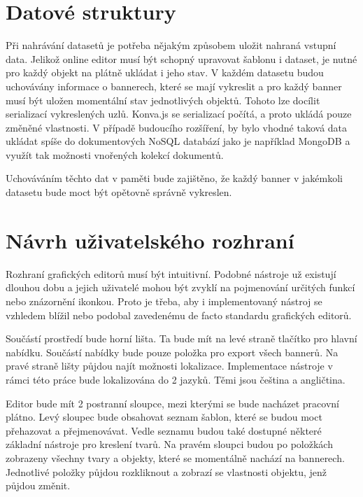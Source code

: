     \section{Datové struktury}
    Při nahrávání datasetů je potřeba nějakým způsobem uložit nahraná vstupní data. Jelikož online editor musí být schopný upravovat šablonu i dataset,
    je nutné pro každý objekt na plátně ukládat i jeho stav. V každém datasetu budou uchovávány informace o bannerech, které se mají vykreslit
    a pro každý banner musí být uložen momentální stav jednotlivých objektů. Tohoto lze docílit serializací vykreslených uzlů.
    Konva.js se serializací počítá, a proto ukládá pouze změněné vlastnosti. V případě budoucího rozšíření, by bylo vhodné taková data ukládat spíše do
    dokumentových NoSQL databází jako je například MongoDB a využít tak možnosti vnořených kolekcí dokumentů. 

    Uchováváním těchto dat v paměti bude zajištěno, že každý banner v jakémkoli datasetu bude moct být opětovně správně vykreslen.

    \section{Návrh uživatelského rozhraní}
    Rozhraní grafických editorů musí být intuitivní. Podobné nástroje už existují dlouhou dobu a jejich uživatelé mohou být zvyklí na pojmenování určitých funkcí
    nebo znázornění ikonkou. Proto je třeba, aby i implementovaný nástroj se vzhledem blížil nebo podobal zavedenému de facto standardu grafických editorů. 

    Součástí prostředí bude horní lišta. Ta bude mít na levé straně tlačítko pro hlavní nabídku. Součástí nabídky bude pouze položka pro export všech bannerů.
    Na pravé straně lišty půjdou najít možnosti lokalizace. Implementace nástroje v rámci této práce bude lokalizována do 2 jazyků. Těmi jsou čeština a angličtina. 

    Editor bude mít 2 postranní sloupce, mezi kterými se bude nacházet pracovní plátno. Levý sloupec bude obsahovat seznam šablon,
    které se budou moct přehazovat a přejmenovávat. Vedle seznamu budou také dostupné některé základní nástroje pro kreslení tvarů.
    Na pravém sloupci budou po položkách zobrazeny všechny tvary a objekty, které se momentálně nachází na bannerech.
    Jednotlivé položky půjdou rozkliknout a zobrazí se vlastnosti objektu, jenž půjdou změnit.

